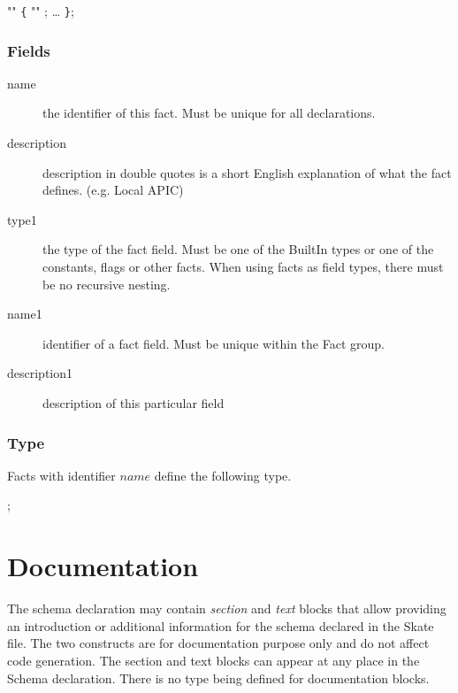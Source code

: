\documentclass[a4paper,11pt,twoside]{report}
\begin{document}
{{\begin{syntax}
   "" \verb+{+
      "" ;
    \ldots
\verb+}+;
\end{syntax}

\subsubsection{Fields}

\begin{description}
    \item[name] the identifier of this fact. Must be unique for all 
                declarations.
    
    \item[description] description in double quotes is a short English          
                       explanation of what the fact defines. (e.g. Local APIC)
    
    \item[type1] the type of the fact field. Must be one of the BuiltIn types
                 or one of the constants, flags or other facts. When using 
                 facts as field types, there must be no recursive nesting.

    \item [name1] identifier of a fact field. Must be unique within the 
                  Fact group.   
    
    \item [description1] description of this particular field
\end{description}

\subsubsection{Type}
Facts with identifier $name$ define the following type.

\begin{syntax}
 ;
\end{syntax}


\section{Documentation}

The schema declaration may contain \emph{section} and \emph{text} blocks that
allow providing an introduction or additional information for the schema 
declared in the Skate file. The two constructs are for documentation purpose 
only and do not affect code generation. The section and text blocks can appear
at any place in the Schema declaration. There is no type being defined for 
documentation blocks.

}}
\end{document}
